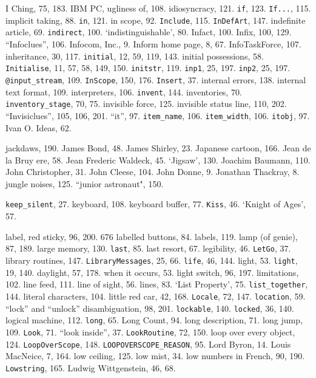 {{{I Ching, 75, 183.
IBM PC, ugliness of, 108.
idiosyncracy, 121.
{{\tt if}}, 123.
{{\tt If...}}, 115.
implicit taking, 88.
{{\tt in}}, 121.
in scope, 92.
{{\tt Include}}, 115.
{{\tt InDefArt}}, 147.
indefinite article, 69.
{{\tt indirect}}, 100.
`indistinguishable', 80.
Infact, 100.
Infix, 100, 129.
``Infoclues'', 106.
Infocom, Inc., 9.
Inform home page, 8, 67.
InfoTaskForce, 107.
inheritance, 30, 117.
{{\tt initial}}, 12, 59, 119, 143.
initial possessions, 58.
{{\tt Initialise}}, 11, 57, 58, 149, 150.
{{\tt initstr}}, 119.
{{\tt inp1}}, 25, 197.
{{\tt inp2}}, 25, 197.
{{\tt @input\_stream}}, 109.
{{\tt InScope}}, 150, 176.
{{\tt Insert}}, 37.
internal errors, 138.
internal text format, 109.
interpreters, 106.
{{\tt invent}}, 144.
inventories, 70.
{{\tt inventory\_stage}}, 70, 75.
invisible force, 125.
invisible status line, 110, 202.
``Invisiclues'', 105, 106, 201.
``it'', 97.
{{\tt item\_name}}, 106.
{{\tt item\_width}}, 106.
{{\tt itobj}}, 97.
Ivan O. Ideas, 62.

jackdaws, 190.
James Bond, 48.
James Shirley, 23.
Japanese cartoon, 166.
Jean de la Bruy{ e}re, 58.
Jean Frederic Waldeck, 45.
`Jigsaw', 130.
Joachim Baumann, 110.
John Christopher, 31.
John Cleese, 104.
John Donne, 9.
Jonathan Thackray, 8.
jungle noises, 125.
``junior astronaut", 150.

{{\tt keep\_silent}}, 27.
keyboard, 108.
keyboard buffer, 77.
{{\tt Kiss}}, 46.
`Knight of Ages', 57.

label, red sticky, 96, 200.
676 labelled buttons, 84.
labels, 119.
lamp (of genie), 87, 189.
large memory, 130.
{{\tt last}}, 85.
last resort, 67.
legibility, 46.
{{\tt LetGo}}, 37.
library routines, 147.
{{\tt LibraryMessages}}, 25, 66.
{{\tt life}}, 46, 144.
light, 53.
{{\tt light}}, 19, 140.
\quad  daylight, 57, 178.
\quad  when it occurs, 53.
light switch, 96, 197.
limitations, 102.
line feed, 111.
line of sight, 56.
lines, 83.
`List Property', 75.
{{\tt list\_together}}, 144.
literal characters, 104.
little red car, 42, 168.
{{\tt Locale}}, 72, 147.
{{\tt location}}, 59.
``lock'' and ``unlock'' disambiguation, 98, 201.
{{\tt lockable}}, 140.
{{\tt locked}}, 36, 140.
logical machine, 112.
{{\tt long}}, 65.
Long Count, 94.
long description, 71.
long jump, 109.
{{\tt Look}}, 71.
``look inside'', 37.
{{\tt LookRoutine}}, 72, 150.
loop over every object, 124.
{{\tt LoopOverScope}}, 148.
{{\tt LOOPOVERSCOPE\_REASON}}, 95.
Lord Byron, 14.
Louis MacNeice, 7, 164.
low ceiling, 125.
low mist, 34.
low numbers in French, 90, 190.
{{\tt Lowstring}}, 165.
Ludwig Wittgenstein, 46, 68.

}}}
